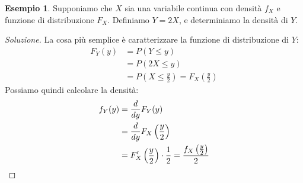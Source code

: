\documentclass{article}
\theoremstyle{plain}
\theoremstyle{definition}
\newtheorem{esempio}{Esempio}[section]
\theoremstyle{remark}
\newenvironment{soluzione}
	{\renewcommand\qedsymbol{$\mathwitch*$}\begin{proof}[Soluzione]}
	{\end{proof}}
\renewcommand{\qedsymbol}{$\mathrightghost$}
\begin{document}
\begin{esempio}
	Supponiamo che $X$ sia una variabile continua con densità $f_X$ e funzione di distribuzione $F_X$. Definiamo $Y=2X$, e determiniamo la densità di $Y$.
	\begin{soluzione}
		La cosa più semplice è caratterizzare la funzione di distribuzione di $Y$:
		\begin{align*}
			F_Y(y)&=P(Y\leq y)\\
			&=P(2X\leq y)\\
			&=P\left(X\leq \frac{y}{2}\right)=F_X\left(\frac{y}{2}\right)
		\end{align*}
		Possiamo quindi calcolare la densità:
		\begin{align*}
			f_Y(y)&=\frac{d}{dy}F_Y(y)\\
			&=\frac{d}{dy}F_X\left(\frac{y}{2}\right)\\
			&=F_X'\left(\frac{y}{2}\right)\cdot\frac{1}{2}=\frac{f_X\left(\frac{y}{2}\right)}{2}\qedhere
		\end{align*}
	\end{soluzione}
\end{esempio}
\end{document}
